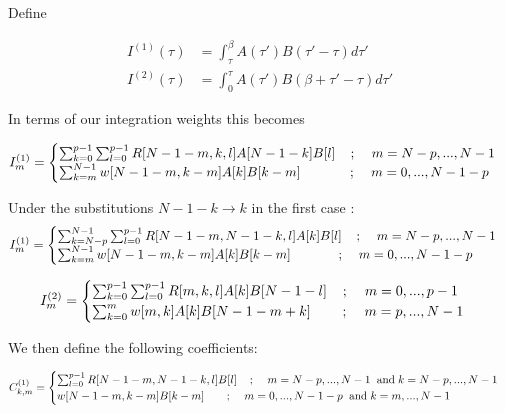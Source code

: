 \documentclass[]{article}
\newcommand{\AND}{\hspace{0.2cm} \mathrm{and} \hspace{0.1cm}}
\begin{document}
Define 

\[
\begin{split}
I^{(1)}(\tau) &= \int_\tau^\beta A(\tau')B(\tau'-\tau) d\tau' \\
I^{(2)}(\tau) &= \int_0^\tau A(\tau')B(\beta+\tau'-\tau) d\tau'
\end{split}
\]

In terms of our integration weights this becomes

\[
I^{(1)}_m =\begin{cases}
           \sum_{k=0}^{p-1} \sum_{l=0}^{p-1} R[N-1-m,k,l] A[N-1-k] B[l] \hspace{0.4cm}; \hspace{0.4cm} m=N-p,...,N-1\\
           \sum_{k=m}^{N-1} w[N-1-m,k-m] A[k] B[k-m] \hspace{1.3cm}; \hspace{0.4cm} m=0,...,N-1-p
           \end{cases}
\]

Under the substitutions $N-1-k \rightarrow k$ in the first case :
\[
I^{(1)}_m =\begin{cases}
           \sum_{k=N-p}^{N-1} \sum_{l=0}^{p-1} R[N-1-m,N-1-k,l] A[k] B[l] \hspace{0.4cm}; \hspace{0.4cm} m=N-p,...,N-1\\
           \sum_{k=m}^{N-1} w[N-1-m,k-m] A[k] B[k-m] \hspace{1.3cm}; \hspace{0.4cm} m=0,...,N-1-p
           \end{cases}
\]

\[
I^{(2)}_m =\begin{cases}
           \sum_{k=0}^{p-1} \sum_{l=0}^{p-1} R[m,k,l] A[k] B[N-1-l] \hspace{0.4cm}; \hspace{0.4cm} m=0,...,p-1\\
           \sum_{k=0}^m w[m,k] A[k] B[N-1-m+k] \hspace{0.8cm}; \hspace{0.4cm} m=p,...,N-1
           \end{cases}
\]


We then define the following coefficients:

\[
C^{(1)}_{k,m} =\begin{cases}
           \sum_{l=0}^{p-1} R[N-1-m,N-1-k,l] B[l] \hspace{0.4cm}; \hspace{0.4cm} m=N-p,...,N-1 \AND k=N-p,...,N-1\\
           w[N-1-m,k-m] B[k-m] \hspace{0.7cm}; \hspace{0.4cm} m=0,...,N-1-p \AND k=m,...,N-1
           \end{cases}
\]
\end{document}

